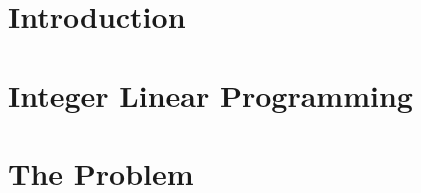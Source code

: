 \documentclass[12pt]{report}
\begin{document}

\tableofcontents

\chapter{Introduction}


\chapter{Integer Linear Programming}


\chapter{The Problem}





\end{document}
